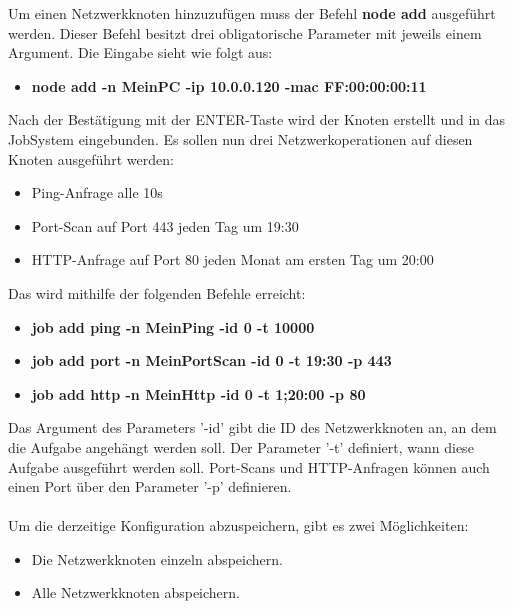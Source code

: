 \documentclass[12pt,a4paper]{report}
\begin{document}
\begin{onehalfspace}
Um einen Netzwerkknoten hinzuzufügen muss der Befehl \textbf{node add} ausgeführt werden. Dieser Befehl besitzt drei obligatorische Parameter mit jeweils einem Argument. Die Eingabe sieht wie folgt aus:\\

\begin{itemize}
\item \textbf{node add -n MeinPC -ip 10.0.0.120 -mac FF:00:00:00:11}\\
\end{itemize}

Nach der Bestätigung mit der ENTER-Taste wird der Knoten erstellt und in das JobSystem eingebunden. Es sollen nun drei Netzwerkoperationen auf diesen Knoten ausgeführt werden:

\begin{itemize}
\item Ping-Anfrage alle 10s
\item Port-Scan auf Port 443 jeden Tag um 19:30
\item HTTP-Anfrage auf Port 80 jeden Monat am ersten Tag um 20:00
\end{itemize}

Das wird mithilfe der folgenden Befehle erreicht:\\

\begin{itemize}
\item \textbf{job add ping -n MeinPing -id 0 -t 10000}
\item \textbf{job add port -n MeinPortScan -id 0 -t 19:30 -p 443}
\item \textbf{job add http -n MeinHttp -id 0 -t 1;20:00 -p 80}
\end{itemize}

Das Argument des Parameters '-id' gibt die ID des Netzwerkknoten an, an dem die Aufgabe angehängt werden soll. Der Parameter '-t' definiert, wann diese Aufgabe ausgeführt werden soll. Port-Scans und HTTP-Anfragen können auch einen Port über den Parameter '-p' definieren.\\\\

Um die derzeitige Konfiguration abzuspeichern, gibt es zwei Möglichkeiten:

\begin{itemize}
\item Die Netzwerkknoten einzeln abspeichern.
\item Alle Netzwerkknoten abspeichern.
\end{itemize}


\end{onehalfspace}
\end{document}
